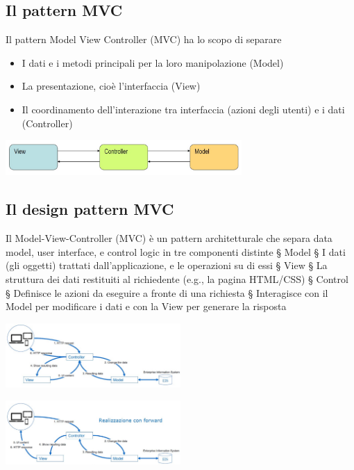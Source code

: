 \begin{itemize}
\subsection{Il pattern MVC}
Il pattern Model View Controller (MVC) ha lo scopo di separare
\begin{itemize}
    \item I dati e i metodi principali per la loro manipolazione (Model)
    \item La presentazione, cioè l'interfaccia (View)
    \item Il coordinamento dell'interazione tra interfaccia (azioni degli utenti) e i dati (Controller)
\end{itemize}
\begin{center}
    \includegraphics[width=0.675\textwidth]{img/appWeb24.jpg}
\end{center}

\subsection{Il design pattern MVC}
Il Model-View-Controller (MVC) è un pattern architetturale che separa data model, user interface, e control logic in tre
componenti distinte
§ Model
§ I dati (gli oggetti) trattati dall'applicazione, e le operazioni su di essi
§ View
§ La struttura dei dati restituiti al richiedente (e.g., la pagina HTML/CSS)
§ Control
§ Definisce le azioni da eseguire a fronte di una richiesta
§ Interagisce con il Model per modificare i dati e con la View per generare la risposta
\begin{center}
    \includegraphics[width=0.5\textwidth]{img/appWeb25.jpg}
\end{center}
\begin{center}
    \includegraphics[width=0.5\textwidth]{img/appWeb26.jpg}
\end{center}


\end{itemize}
